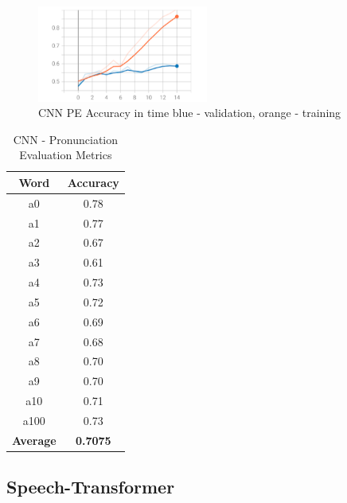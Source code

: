 \documentclass[conference]{IEEEtran}
\begin{document}
\begin{figure}[hbtp]
    \centerline{\includegraphics[width=0.5\textwidth]{Figures/Fig_CNN_PE_acc.png}}
    \caption{CNN PE Accuracy in time \textbar \; blue - validation, orange - training}
    \label{CNNPEAcc} %
    \end{figure}

\begin{table}[hbtp]
    \caption{CNN - Pronunciation Evaluation Metrics}
    \begin{center}
    \begin{tabular}{|c|c|}
    \hline
    \textbf{Word} & {\textbf{Accuracy}} \\
    \hline
    a0 & 0.78 \\
    \hline
    a1 & 0.77 \\
    \hline
    a2 & 0.67 \\
    \hline
    a3 & 0.61 \\
    \hline
    a4 & 0.73 \\
    \hline
    a5 & 0.72 \\
    \hline
    a6 & 0.69 \\
    \hline
    a7 & 0.68 \\
    \hline
    a8 & 0.70 \\
    \hline
    a9 & 0.70 \\
    \hline
    a10 & 0.71 \\
    \hline
    a100 & 0.73 \\
    \hline
    \textbf{Average} & \textbf{0.7075} \\
    \hline
    \end{tabular}
    \label{tab_CNNPE_acc}
    \end{center}
    \end{table}

\subsection{Speech-Transformer}
\end{document}
